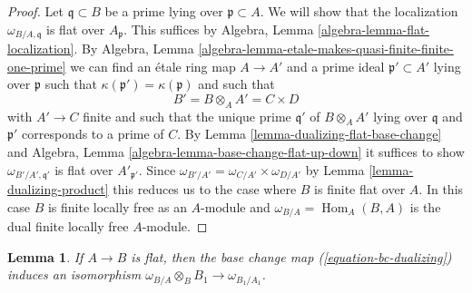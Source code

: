 \documentclass{stacks-project}
\theoremstyle{plain}
\newtheorem{lemma}[subsection]{Lemma}
\theoremstyle{definition}
\theoremstyle{remark}
\numberwithin{equation}{subsection}
\def\Hom{\mathop{\mathrm{Hom}}\nolimits}
\begin{document}
\begin{proof}
Let $\mathfrak q \subset B$ be a prime lying over $\mathfrak p \subset A$.
We will show that the localization $\omega_{B/A, \mathfrak q}$ is flat
over $A_\mathfrak p$.
This suffices by Algebra, Lemma \ref{algebra-lemma-flat-localization}.
By
Algebra, Lemma \ref{algebra-lemma-etale-makes-quasi-finite-finite-one-prime}
we can find an \'etale ring map $A \to A'$ and a prime
ideal $\mathfrak p' \subset A'$ lying over $\mathfrak p$
such that $\kappa(\mathfrak p') = \kappa(\mathfrak p)$ and
such that
$$
B' = B \otimes_A A' = C \times D
$$
with $A' \to C$ finite and such that the unique prime $\mathfrak q'$
of $B \otimes_A A'$ lying over $\mathfrak q$ and $\mathfrak p'$
corresponds to a prime of $C$. By 
Lemma \ref{lemma-dualizing-flat-base-change}
and Algebra, Lemma \ref{algebra-lemma-base-change-flat-up-down}
it suffices to show $\omega_{B'/A', \mathfrak q'}$
is flat over $A'_{\mathfrak p'}$.
Since $\omega_{B'/A'} = \omega_{C/A'} \times \omega_{D/A'}$
by Lemma \ref{lemma-dualizing-product}
this reduces us to the case where $B$ is finite flat over $A$.
In this case $B$ is finite locally free as an $A$-module
and $\omega_{B/A} = \Hom_A(B, A)$ is the dual finite
locally free $A$-module.
\end{proof}

\begin{lemma}
\label{lemma-dualizing-base-change-of-flat}
If $A \to B$ is flat, then the base change map (\ref{equation-bc-dualizing})
induces an isomorphism $\omega_{B/A} \otimes_B B_1 \to \omega_{B_1/A_1}$.
\end{lemma}
\end{document}
